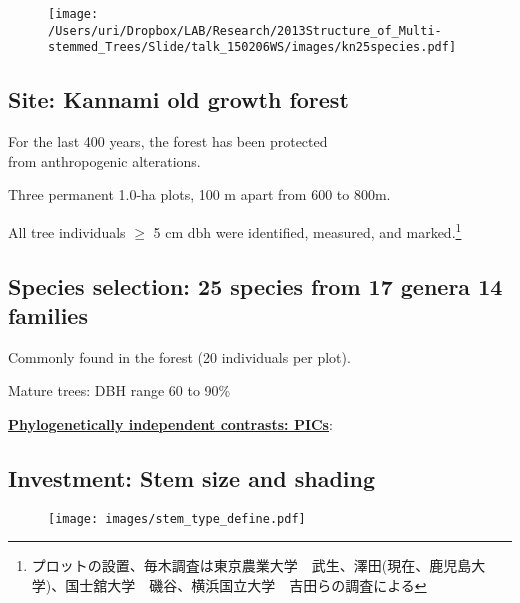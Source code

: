\documentclass[a0, 25, plainboxedsections]{sciposter} %
\begin{document}
\begin{multicols}{2}

\begin{wrapfigure}{r}{16.7em}
  \centering
    \texttt{[image: /Users/uri/Dropbox/LAB/Research/2013Structure\_of\_Multi-stemmed\_Trees/Slide/talk\_150206WS/images/kn25species.pdf]} %
\end{wrapfigure}

\subsection*{Site: Kannami old growth forest}

\faCaretRight For the last 400 years, the forest has been protected\\ from anthropogenic alterations.

\faCaretRight Three permanent 1.0-ha plots, 100 m apart from 600 to 800m.

\faCaretRight All tree individuals $\geq$ 5 cm dbh were identified, measured, and marked.\footnote{プロットの設置、毎木調査は東京農業大学　武生、澤田(現在、鹿児島大学)、国士舘大学　磯谷、横浜国立大学　吉田らの調査による}

\subsection*{Species selection: 25 species from 17 genera 14 families}

\faCaretRight Commonly found in the forest (20 individuals per plot).

\faCaretRight Mature trees: DBH range 60 to 90\%

\faCaretRight \textbf{\underline{Phylogenetically independent contrasts: PICs}}: %

\columnbreak
\subsection*{Investment: Stem size and shading}

\begin{figure}
  \centering
	\texttt{[image: images/stem\_type\_define.pdf]}
\end{figure}


\end{multicols}
\end{document}
